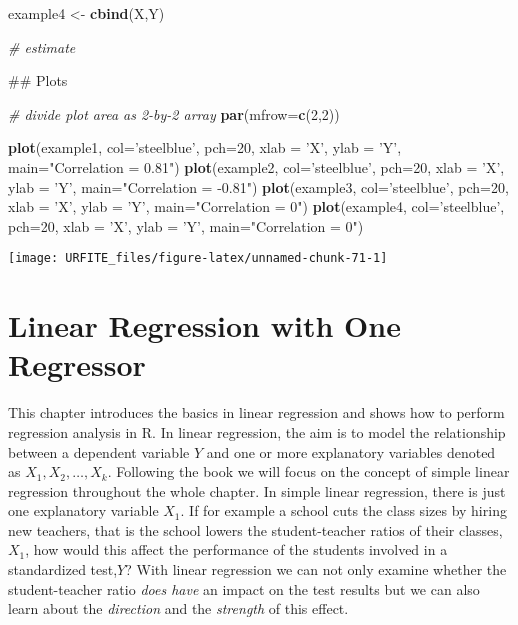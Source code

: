 \documentclass[]{book}
\newenvironment{Shaded}{\begin{snugshade}}{\end{snugshade}}
\newcommand{\KeywordTok}[1]{\textcolor[rgb]{0.13,0.29,0.53}{\textbf{#1}}}
\newcommand{\DataTypeTok}[1]{\textcolor[rgb]{0.13,0.29,0.53}{#1}}
\newcommand{\DecValTok}[1]{\textcolor[rgb]{0.00,0.00,0.81}{#1}}
\newcommand{\StringTok}[1]{\textcolor[rgb]{0.31,0.60,0.02}{#1}}
\newcommand{\CommentTok}[1]{\textcolor[rgb]{0.56,0.35,0.01}{\textit{#1}}}
\newcommand{\NormalTok}[1]{#1}
\theoremstyle{definition}
\theoremstyle{definition}
\theoremstyle{definition}
\theoremstyle{remark}
\begin{document}
\begin{Shaded}
\begin{Highlighting}[]
\NormalTok{example4 <-}\StringTok{ }\KeywordTok{cbind}\NormalTok{(X,Y)}

\CommentTok{# estimate}

\NormalTok{## Plots}

\CommentTok{# divide plot area as 2-by-2 array}
\KeywordTok{par}\NormalTok{(}\DataTypeTok{mfrow=}\KeywordTok{c}\NormalTok{(}\DecValTok{2}\NormalTok{,}\DecValTok{2}\NormalTok{))}

\KeywordTok{plot}\NormalTok{(example1, }\DataTypeTok{col=}\StringTok{'steelblue'}\NormalTok{, }\DataTypeTok{pch=}\DecValTok{20}\NormalTok{, }\DataTypeTok{xlab =} \StringTok{'X'}\NormalTok{, }\DataTypeTok{ylab =} \StringTok{'Y'}\NormalTok{, }\DataTypeTok{main=}\StringTok{"Correlation = 0.81"}\NormalTok{)}
\KeywordTok{plot}\NormalTok{(example2, }\DataTypeTok{col=}\StringTok{'steelblue'}\NormalTok{, }\DataTypeTok{pch=}\DecValTok{20}\NormalTok{, }\DataTypeTok{xlab =} \StringTok{'X'}\NormalTok{, }\DataTypeTok{ylab =} \StringTok{'Y'}\NormalTok{, }\DataTypeTok{main=}\StringTok{"Correlation = -0.81"}\NormalTok{)}
\KeywordTok{plot}\NormalTok{(example3, }\DataTypeTok{col=}\StringTok{'steelblue'}\NormalTok{, }\DataTypeTok{pch=}\DecValTok{20}\NormalTok{, }\DataTypeTok{xlab =} \StringTok{'X'}\NormalTok{, }\DataTypeTok{ylab =} \StringTok{'Y'}\NormalTok{, }\DataTypeTok{main=}\StringTok{"Correlation = 0"}\NormalTok{)}
\KeywordTok{plot}\NormalTok{(example4, }\DataTypeTok{col=}\StringTok{'steelblue'}\NormalTok{, }\DataTypeTok{pch=}\DecValTok{20}\NormalTok{, }\DataTypeTok{xlab =} \StringTok{'X'}\NormalTok{, }\DataTypeTok{ylab =} \StringTok{'Y'}\NormalTok{, }\DataTypeTok{main=}\StringTok{"Correlation = 0"}\NormalTok{)}
\end{Highlighting}
\end{Shaded}

\begin{center}\texttt{[image: URFITE\_files/figure-latex/unnamed-chunk-71-1]} \end{center}

\hypertarget{lrwor}{\chapter{Linear Regression with One
Regressor}\label{lrwor}}

This chapter introduces the basics in linear regression and shows how to
perform regression analysis in R. In linear regression, the aim is to
model the relationship between a dependent variable \(Y\) and one or
more explanatory variables denoted as \(X_1, X_2, \dots, X_k\).
Following the book we will focus on the concept of simple linear
regression throughout the whole chapter. In simple linear regression,
there is just one explanatory variable \(X_1\). If for example a school
cuts the class sizes by hiring new teachers, that is the school lowers
the student-teacher ratios of their classes, \(X_1\), how would this
affect the performance of the students involved in a standardized
test,\(Y\)? With linear regression we can not only examine whether the
student-teacher ratio \emph{does have} an impact on the test results but
we can also learn about the \emph{direction} and the \emph{strength} of
this effect.
\end{document}
